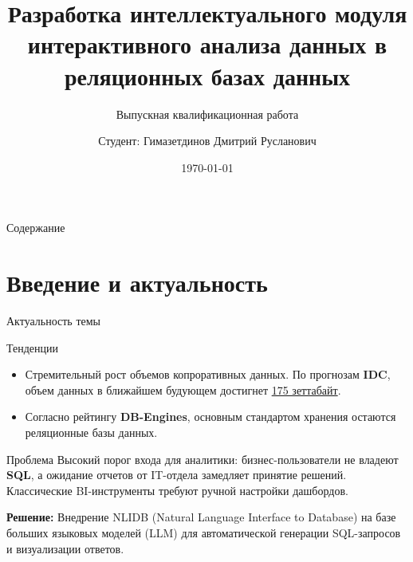 \documentclass[10pt, aspectratio=169, unicode]{beamer}
\title[Мониторинг ВКР]{Разработка интеллектуального модуля интерактивного анализа данных в реляционных базах данных}
\subtitle{Выпускная квалификационная работа}
\author[Гимазетдинов Д.Р.]{Студент: Гимазетдинов Дмитрий Русланович}
\institute[МАИ]{Московский авиационный институт\\ (Национальный исследовательский университет)}
\date{\today}
\begin{document}

\begin{frame}
    \titlepage
\end{frame}

\begin{frame}{Содержание}
    \tableofcontents %
\end{frame}

\section{Введение и актуальность}
\begin{frame}{Актуальность темы}
    \begin{block}{Тенденции}
        \begin{itemize}
            \item Стремительный рост объемов копроративных данных. По прогнозам \textbf{IDC}, объем данных в ближайшем будующем достигнет \underline{175 зеттабайт}.
            \item  Согласно рейтингу \textbf{DB-Engines}, основным стандартом хранения остаются реляционные базы данных.
        \end{itemize}
    \end{block}

    \begin{alertblock}{Проблема}
        Высокий порог входа для аналитики: бизнес-пользователи не владеют \textbf{SQL}, а ожидание отчетов от IT-отдела замедляет принятие решений.
        Классические BI-инструменты требуют ручной настройки дашбордов.
    \end{alertblock}

    \textbf{Решение:} Внедрение NLIDB (Natural Language Interface to Database) на базе больших языковых моделей (LLM) для автоматической генерации SQL-запросов и визуализации ответов.
\end{frame}
\end{document}
